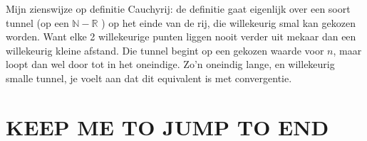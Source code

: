 \documentclass{article}
\begin{document}
Mijn zienswijze op definitie Cauchyrij: de definitie gaat eigenlijk over een soort tunnel (op een $\mathbb{N}-\mathbb{R}$ ) op het einde van de rij, die willekeurig smal kan gekozen worden. Want elke 2 willekeurige punten liggen nooit verder uit mekaar dan een willekeurig kleine afstand. Die tunnel begint op een gekozen waarde voor $n$, maar loopt dan wel door tot in het oneindige. Zo'n oneindig lange, en willekeurig smalle tunnel, je voelt aan dat dit equivalent is met convergentie. 


\section{KEEP ME TO JUMP TO END}
\end{document}
